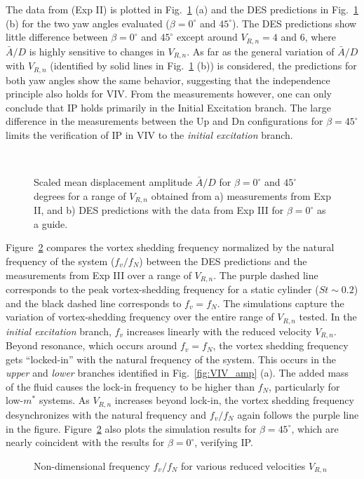 The data from \citet{franzini2013one} (Exp II) is plotted in
Fig.~\ref{fig:VIV_yaw} (a) and the DES predictions in Fig.~\ref{fig:VIV_yaw}
(b) for the two yaw angles evaluated ($\beta=0^\circ$ and $45^\circ$). The DES
predictions show little difference between $\beta=0^\circ$ and $45^\circ$
except around $V_{R,n}=4$ and $6$, where $\bar{A}/D$ is highly sensitive to
changes in $V_{R,n}$. As far as the general variation of $\bar{A}/D$ with
$V_{R,n}$ (identified by solid lines in Fig.~\ref{fig:VIV_yaw} (b)) is
considered, the predictions for both yaw angles show the same behavior,
suggesting that the independence principle also holds for VIV. From the
measurements however, one can only conclude that IP holds primarily in the
Initial Excitation branch. The large difference in the measurements between the
Up and Dn configurations for $\beta=45^\circ$ limits the verification of IP in
VIV to the {\em initial excitation}
branch.
%
\begin{figure}[htb!]
  \qquad
     {} \\
  \caption{Scaled mean displacement amplitude $\bar{A}/D$ for $\beta=0^\circ$
    and $45^\circ$ degrees for a range of $V_{R,n}$ obtained from a) measurements
    from Exp II, and b) DES predictions with the data from Exp III for
    $\beta=0^\circ$ as a guide.}
  \label{fig:VIV_yaw}
\end{figure}

Figure~\ref{fig:VIV_freq} compares the vortex shedding frequency normalized by
the natural frequency of the system ($f_v/f_N$) between the DES predictions and
the measurements from Exp III over a range of $V_{R,n}$. The purple dashed line
corresponds to the peak vortex-shedding frequency for a static cylinder
($St\sim0.2$) and the black dashed line corresponds to $f_v=f_N$. The
simulations capture the variation of vortex-shedding frequency over the entire
range of $V_{R,n}$ tested. In the {\em initial excitation} branch, $f_v$
increases linearly with the reduced velocity $V_{R,n}$. Beyond resonance, which
occurs around $f_v=f_N$, the vortex shedding frequency gets ``locked-in'' with
the natural frequency of the system.  This occurs in the {\em upper} and {\em
lower} branches identified in Fig.~\ref{fig:VIV_amp} (a).  The added mass of
the fluid causes the lock-in frequency to be higher than $f_N$, particularly
for low-$m^*$ systems. As $V_{R,n}$ increases beyond lock-in, the vortex
shedding frequency desynchronizes with the natural frequency and $f_v/f_N$
again follows the purple line in the figure.  Figure~\ref{fig:VIV_freq} also
plots the simulation results for $\beta=45^\circ$, which are nearly coincident
with the results for $\beta=0^\circ$, verifying IP.
%
\begin{figure}[htb!]
  \caption{Non-dimensional frequency $f_v/f_N$ for various reduced velocities
    $V_{R,n}$}
  \label{fig:VIV_freq}
\end{figure}
